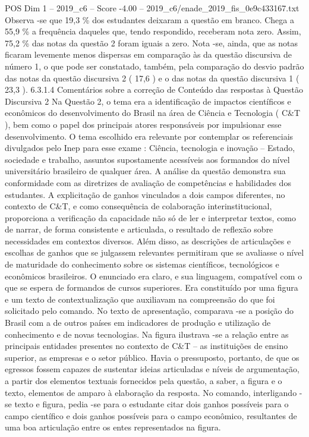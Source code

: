 \begin{textsample}{POS Dim 1 – 2019\_c6 – Score -4.00 – 2019\_c6/enade\_2019\_fis\_0e9c433167.txt}
Observa -se que 19,3 \% dos estudantes deixaram a questão em branco.
Chega a 55,9 \% a frequência daqueles que, tendo respondido, receberam nota zero.
Assim, 75,2 \% das notas da questão 2 foram iguais a zero.
Nota -se, ainda, que as notas ficaram levemente menos dispersas em comparação às da questão discursiva de número 1, o que pode ser constatado, também, pela comparação do desvio padrão das notas da questão discursiva 2 ( 17,6 ) e o das notas da questão discursiva 1 ( 23,3 ). 6.3.1.4 Comentários sobre a correção de Conteúdo das respostas à Questão Discursiva 2 Na Questão 2, o tema era a identificação de impactos científicos e econômicos do desenvolvimento do Brasil na área de Ciência e Tecnologia ( C\&T ), bem como o papel dos principais atores responsáveis por impulsionar esse desenvolvimento.
O tema escolhido era relevante por contemplar os referenciais divulgados pelo Inep para esse exame : Ciência, tecnologia e inovação – Estado, sociedade e trabalho, assuntos supostamente acessíveis aos formandos do nível universitário brasileiro de qualquer área.
A análise da questão demonstra sua conformidade com as diretrizes de avaliação de competências e habilidades dos estudantes.
A explicitação de ganhos vinculados a dois campos diferentes, no contexto de C\&T, e como consequência de colaboração interinstitucional, proporciona a verificação da capacidade não só de ler e interpretar textos, como de narrar, de forma consistente e articulada, o resultado de reflexão sobre necessidades em contextos diversos.
Além disso, as descrições de articulações e escolhas de ganhos que se julgassem relevantes permitiram que se avaliasse o nível de maturidade do conhecimento sobre os sistemas científicos, tecnológicos e econômicos brasileiros.
O enunciado era claro, e sua linguagem, compatível com o que se espera de formandos de cursos superiores.
Era constituído por uma figura e um texto de contextualização que auxiliavam na compreensão do que foi solicitado pelo comando.
No texto de apresentação, comparava -se a posição do Brasil com a de outros países em indicadores de produção e utilização de conhecimento e de novas tecnologias.
Na figura ilustrava -se a relação entre as principais entidades presentes no contexto de C\&T – as instituições de ensino superior, as empresas e o setor público.
Havia o pressuposto, portanto, de que os egressos fossem capazes de sustentar ideias articuladas e níveis de argumentação, a partir dos elementos textuais fornecidos pela questão, a saber, a figura e o texto, elementos de amparo à elaboração da resposta.
No comando, interligando -se texto e figura, pedia -se para o estudante citar dois ganhos possíveis para o campo científico e dois ganhos possíveis para o campo econômico, resultantes de uma boa articulação entre os entes representados na figura.

\end{textsample}
